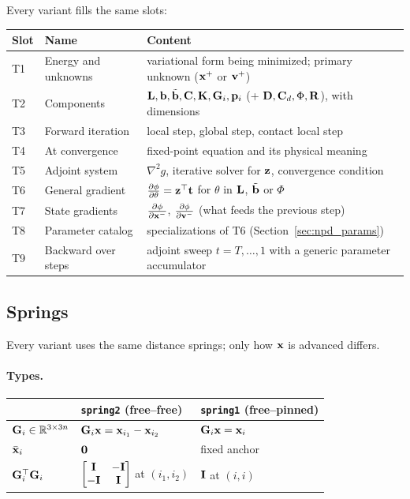 \noindent Every variant fills the same slots:
\begin{center}
\begin{tabular}{lll}
\textbf{Slot} & \textbf{Name} & \textbf{Content} \\ \hline
T1 & Energy and unknowns     & variational form being minimized; primary unknown ($\mathbf{x}^+$ or $\mathbf{v}^+$) \\
T2 & Components              & $\mathbf{L}, \mathbf{b}, \tilde{\mathbf{b}}, \mathbf{C}, \mathbf{K}, \mathbf{G}_i, \mathbf{p}_i$ (+ $\mathbf{D}, \mathbf{C}_d, \Phi, \mathbf{R}$), with dimensions \\
T3 & Forward iteration       & local step, global step, contact local step \\
T4 & At convergence          & fixed-point equation and its physical meaning \\
T5 & Adjoint system          & $\nabla^2 g$, iterative solver for $\mathbf{z}$, convergence condition \\
T6 & General gradient        & $\frac{\partial \phi}{\partial \theta} = \mathbf{z}^\top\mathbf{t}$ for $\theta$ in $\mathbf{L}$, $\tilde{\mathbf{b}}$ or $\Phi$ \\
T7 & State gradients         & $\frac{\partial \phi}{\partial \mathbf{x}^-}$, $\frac{\partial \phi}{\partial \mathbf{v}^-}$ (what feeds the previous step) \\
T8 & Parameter catalog       & specializations of T6 (Section~\ref{sec:npd_params}) \\
T9 & Backward over steps     & adjoint sweep $t = T,\dots,1$ with a generic parameter accumulator \\
\end{tabular}
\end{center}

\subsection{Springs}
\label{sec:npd_springs}

\noindent Every variant uses the same distance springs; only how $\mathbf{x}$ is advanced differs.

\paragraph{Types.}
\begin{center}
\begin{tabular}{lll}
 & \texttt{spring2} (free--free) & \texttt{spring1} (free--pinned) \\ \hline
$\mathbf{G}_i \in \mathbb{R}^{3\times 3n}$ & $\mathbf{G}_i\mathbf{x} = \mathbf{x}_{i_1} - \mathbf{x}_{i_2}$ & $\mathbf{G}_i\mathbf{x} = \mathbf{x}_i$ \\
$\bar{\mathbf{x}}_i$                  & $\mathbf{0}$ & fixed anchor \\
$\mathbf{G}_i^\top\mathbf{G}_i$             & $\begin{bmatrix}\mathbf{I} & -\mathbf{I}\\ -\mathbf{I} & \mathbf{I}\end{bmatrix}$ at $(i_1,i_2)$ & $\mathbf{I}$ at $(i,i)$ \\
\end{tabular}
\end{center}

